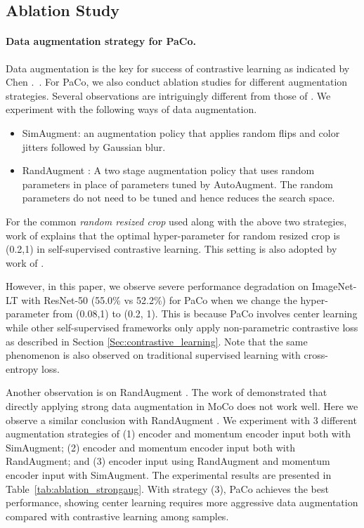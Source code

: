 \documentclass[10pt,twocolumn,letterpaper]{article}
\begin{document}
\subsection{Ablation Study}
\paragraph{Data augmentation strategy for PaCo.}
\label{Sec:data_augmentation}
Data augmentation is the key for success of contrastive learning as indicated by Chen \etal.~\cite{DBLP:conf/icml/ChenK0H20}. For PaCo, we also conduct ablation studies for different augmentation strategies. Several observations are intriguingly different from those of \cite{ouyang2016factors}.
We experiment with the following ways of data augmentation.
\begin{itemize}
	\item SimAugment: an augmentation policy \cite{DBLP:conf/cvpr/He0WXG20, DBLP:journals/corr/abs-2003-04297} that applies random flips and color jitters followed by Gaussian blur.
	\item RandAugment \cite{DBLP:conf/nips/CubukZS020}: A two stage augmentation policy that uses random parameters in place of parameters tuned by AutoAugment. The random parameters do not need to be tuned and hence reduces the search space.
\end{itemize} 

For the common {\it random resized crop} used along with the above two strategies, work of \cite{ouyang2016factors} explains that the optimal hyper-parameter for random resized crop is (0.2,1) in self-supervised contrastive learning. This setting is also adopted by work of \cite{DBLP:conf/icml/ChenK0H20, DBLP:conf/cvpr/He0WXG20, DBLP:journals/corr/abs-2003-04297, DBLP:conf/nips/GrillSATRBDPGAP20, DBLP:conf/nips/CaronMMGBJ20}. 

However, in this paper, we observe severe performance degradation on ImageNet-LT with ResNet-50 (55.0\% vs 52.2\%) for PaCo when we change the hyper-parameter from (0.08,1) to (0.2, 1).
This is because PaCo involves center learning while other self-supervised frameworks only apply non-parametric contrastive loss as described in Section \ref{Sec:contrastive_learning}.
Note that the same phenomenon is also observed on traditional supervised learning with cross-entropy loss.

Another observation is on RandAugment \cite{DBLP:conf/nips/CubukZS020}. The work of \cite{wang2021contrastive} demonstrated that directly applying strong data augmentation in MoCo \cite{DBLP:conf/cvpr/He0WXG20, DBLP:journals/corr/abs-2003-04297} does not work well. Here we observe a similar conclusion with RandAugment \cite{DBLP:conf/nips/CubukZS020}. We experiment with 3 different augmentation strategies of (1) encoder and momentum encoder input both with SimAugment; (2) encoder and momentum encoder input both with RandAugment; and (3) encoder input using RandAugment and momentum encoder input with SimAugment. The experimental results are presented in Table~\ref{tab:ablation_strongaug}. With strategy (3), PaCo achieves the best performance, showing center learning requires more aggressive data augmentation compared with contrastive learning among samples.
\end{document}
